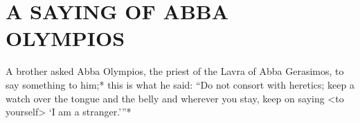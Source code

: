 \chapter{A SAYING OF ABBA OLYMPIOS}

A brother asked Abba Olympios, the priest of the Lavra of Abba Gerasimos, to say something to him;*
this is what he said: ``Do not consort with heretics;
keep a watch over the tongue and the belly and wherever you stay, keep on saying <to yourself> `I am a stranger.'''*

